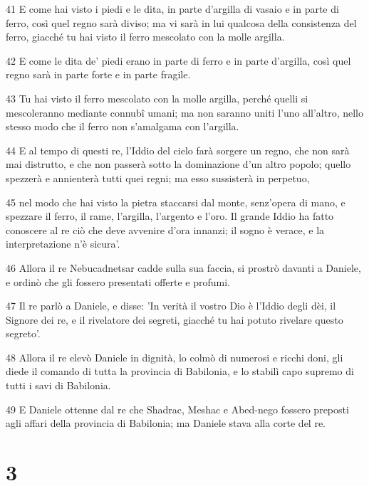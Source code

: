 \par 41 E come hai visto i piedi e le dita, in parte d'argilla di vasaio e in parte di ferro, così quel regno sarà diviso; ma vi sarà in lui qualcosa della consistenza del ferro, giacché tu hai visto il ferro mescolato con la molle argilla.
\par 42 E come le dita de' piedi erano in parte di ferro e in parte d'argilla, così quel regno sarà in parte forte e in parte fragile.
\par 43 Tu hai visto il ferro mescolato con la molle argilla, perché quelli si mescoleranno mediante connubî umani; ma non saranno uniti l'uno all'altro, nello stesso modo che il ferro non s'amalgama con l'argilla.
\par 44 E al tempo di questi re, l'Iddio del cielo farà sorgere un regno, che non sarà mai distrutto, e che non passerà sotto la dominazione d'un altro popolo; quello spezzerà e annienterà tutti quei regni; ma esso sussisterà in perpetuo,
\par 45 nel modo che hai visto la pietra staccarsi dal monte, senz'opera di mano, e spezzare il ferro, il rame, l'argilla, l'argento e l'oro. Il grande Iddio ha fatto conoscere al re ciò che deve avvenire d'ora innanzi; il sogno è verace, e la interpretazione n'è sicura'.
\par 46 Allora il re Nebucadnetsar cadde sulla sua faccia, si prostrò davanti a Daniele, e ordinò che gli fossero presentati offerte e profumi.
\par 47 Il re parlò a Daniele, e disse: 'In verità il vostro Dio è l'Iddio degli dèi, il Signore dei re, e il rivelatore dei segreti, giacché tu hai potuto rivelare questo segreto'.
\par 48 Allora il re elevò Daniele in dignità, lo colmò di numerosi e ricchi doni, gli diede il comando di tutta la provincia di Babilonia, e lo stabilì capo supremo di tutti i savi di Babilonia.
\par 49 E Daniele ottenne dal re che Shadrac, Meshac e Abed-nego fossero preposti agli affari della provincia di Babilonia; ma Daniele stava alla corte del re.

\chapter{3}

